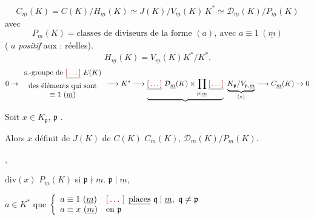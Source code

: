 \documentclass[11pt,a4paper]{article}
\begin{document}
\[
C_{\underline{m}}(K) = C(K)/H_{\underline{m}}(K) \simeq J(K)/V_{\underline{m}}(K)\,K^{*} \simeq \mathcal{D}_{\underline{m}}(K)/P_{\underline{m}}(K)
\]
avec
\[
P_{\underline{m}}(K) = \text{classes de diviseurs de la forme } (a), \ \text{avec } a \equiv 1 \ (\underline{m})
\]
( \struck{\ill{}} \ill{}  $a$ \ill{}
\emph{positif} aux \ill{} \ill{} : \ill{} \ill{} réelles).
\[
H_{\underline{m}}(K) = V_{\underline{m}}(K) K^{*}/K^{*}.
\]
 \ill{} \ill{}
\[
0 \to
\begin{array}{c}
\text{s.-groupe de } \struck{\ill{}}\ E(K) \\
\text{des éléments qui sont} \\
\equiv 1\ (\underline{m})
\end{array}
\longrightarrow K^{*} \longrightarrow \underbrace{\struck{\ill{}}\ \mathcal{D}_{\underline{m}}(K) \times \prod_{\mathfrak{p}\mid\underline{m}} \struck{\ill{}}}\ \underbrace{K_{\mathfrak{p}}/V_{\mathfrak{p},\underline{m}}}_{(*)} \longrightarrow C_{\underline{m}}(K) \to 0
\]

Soit $x \in K_{\mathfrak{p}}$,  $\mathfrak{p}$ \ill{} \ill{}
\ill{} .

Alors $x$ définit \ill{} \ill{} \ill{} de $J(K)$ \ill{} \ill{} de $C(K)$
\ill{} \ill{} $C_{\underline{m}}(K)$, \ill{} \ill{} \ill{} $\mathcal{D}_{\underline{m}}(K)/P_{\underline{m}}(K)$.

 \ill{} , \struck{\ill{}} \struck{\ill{}
\ill{} \ill{}} \ill{} \struck{\ill{} \ill{}}

$\mathrm{div}(x)$ \ill{} \ill{} $P_{\underline{m}}(K)$ si $\mathfrak{p}
\nmid \underline{m}$.  $\mathfrak{p} \mid \underline{m}$, \ill{}

\ill{}  \ill{} $a \in K^{*}$  que
$\left\lbrace
\begin{array}{ll}
a \equiv 1 \ (\underline{m}) & \text{\ill{} \uncertain{places} } \mathfrak{q} \mid \underline{m},\ \mathfrak{q} \neq \mathfrak{p} \\
a \equiv x \ (\underline{m}) & \text{en } \mathfrak{p}
\end{array}\right.$
\end{document}
